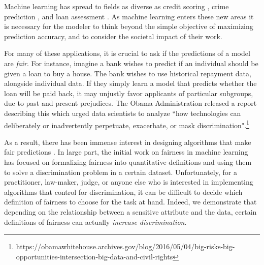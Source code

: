 Machine learning has spread to fields as diverse as credit scoring \cite{khandani2010consumer}, crime prediction \cite{brennan2009evaluating}, and loan assessment \cite{mahoney2007method}. As
machine learning enters these new areas it is necessary for the
modeler to think beyond the simple objective of maximizing prediction
accuracy, and to consider the societal impact of their work.

For many of these applications, it is crucial to
ask if the predictions of a model are
\emph{fair}. For instance, imagine a bank wishes to predict if an individual should be given
a loan to buy a house. The bank wishes to use historical repayment data, alongside  individual data. If they simply learn a model
that  predicts whether the
loan will be paid back, it may unjustly favor
applicants of particular subgroups, due to past and
present prejudices. The Obama Administration released a report
describing this which urged data scientists to
analyze ``how technologies can deliberately or inadvertently
perpetuate, exacerbate, or mask
discrimination".\footnote{https://obamawhitehouse.archives.gov/blog/2016/05/04/big-risks-big-opportunities-intersection-big-data-and-civil-rights}

As a result, there has been immense interest in designing
algorithms that make fair predictions
\cite{hardt2016equality,dwork2012fairness,joseph2016rawlsian,kamishima2011fairness,zliobaite2015survey,zafar2016fairness,zafar2015learning,grgiccase,kleinberg2016inherent,calders2010three,kamiran2012data,bolukbasi2016man,kamiran2009classifying,zemel2013learning,louizos2015variational}. 
In large part, the initial work on fairness in machine learning has
focused on formalizing fairness into quantitative definitions and using them to solve a
discrimination problem in a certain dataset. Unfortunately, for a
practitioner, law-maker, judge, or anyone else who is interested in
implementing algorithms that control for discrimination, it can be
difficult to decide which definition of fairness to choose for the
task at hand. Indeed, we demonstrate that depending on the
relationship between a sensitive attribute and the data, certain
definitions of fairness can actually \emph{increase discrimination}.

